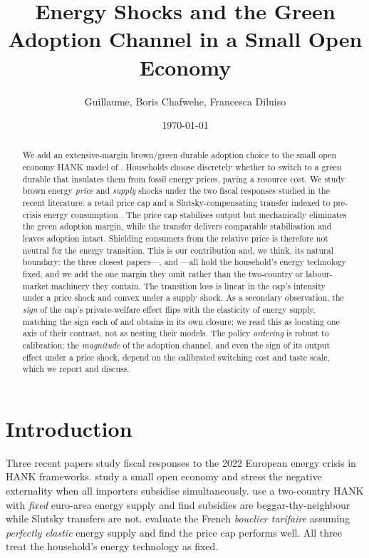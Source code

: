 \documentclass[11pt,a4paper]{article}
\title{\textbf{Energy Shocks and the Green Adoption Channel in a Small Open Economy}}
\author{Guillaume, Boris Chafwehe, Francesca Diluiso}
\date{\today}
\begin{document}
\maketitle

\begin{abstract}
\noindent We add an extensive-margin brown/green durable adoption choice to the
small open economy HANK model of \citet{ARS2024}. Households choose discretely
whether to switch to a green durable that insulates them from fossil energy
prices, paying a resource cost. We study brown energy \emph{price} and
\emph{supply} shocks under the two fiscal responses studied in the recent
literature: a retail price cap \citep{Langot2026} and a Slutsky-compensating
transfer indexed to pre-crisis energy consumption \citep{Bayer2026}. The price
cap stabilises output but mechanically eliminates the green adoption margin,
while the transfer delivers comparable stabilisation and leaves adoption
intact. Shielding consumers from the relative price is therefore not neutral
for the energy transition. This is our contribution and, we think, its natural
boundary: the three closest papers---\citet{ARS2024}, \citet{Bayer2026} and
\citet{Langot2026}---all hold the household's energy technology fixed, and we
add the one margin they omit rather than the two-country or labour-market
machinery they contain. The transition loss is linear in the cap's intensity
under a price shock and convex under a supply shock. As a secondary
observation, the \emph{sign} of the cap's private-welfare effect flips with the
elasticity of energy supply, matching the sign each of \citet{Langot2026} and
\citet{Bayer2026} obtains in its own closure; we read this as locating one axis
of their contrast, not as nesting their models. The policy \emph{ordering} is
robust to calibration; the \emph{magnitude} of the adoption channel, and even
the sign of its output effect under a price shock, depend on the calibrated
switching cost and taste scale, which we report and discuss.
\end{abstract}

\section{Introduction}

Three recent papers study fiscal responses to the 2022 European energy crisis
in HANK frameworks. \citet{ARS2024} study a small open economy and stress the
negative externality when all importers subsidise simultaneously.
\citet{Bayer2026} use a two-country HANK with \emph{fixed} euro-area energy
supply and find subsidies are beggar-thy-neighbour while Slutsky transfers are
not. \citet{Langot2026} evaluate the French \emph{bouclier tarifaire} assuming
\emph{perfectly elastic} energy supply and find the price cap performs well.
All three treat the household's energy technology as fixed.
\end{document}
